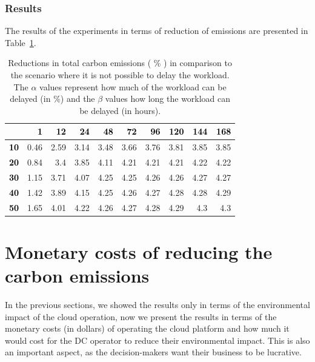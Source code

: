 \subsubsection{Results}

The results of the experiments in terms of reduction of  emissions are presented in Table~\ref{tab:flex_scheduling}.


\begin{table}[h]
\caption{Reductions in total carbon emissions ( \% ) in comparison to the scenario where it is not possible to delay the workload. The $\alpha$ values represent how much of the workload can be delayed (in \%) and the $\beta$ values how long the workload can be delayed (in hours). }\centering
\label{tab:flex_scheduling}
\begin{tabular}{|l|r|r|r|r|r|r|r|r|r|}
\hline
\backslashbox{$\alpha$}{$\beta$} &   \textcolor{black}{\textbf{ 1}} &  \textcolor{black}{\textbf{ 12 }} &  \textcolor{black}{\textbf{ 24 }} &  \textcolor{black}{\textbf{ 48 }}  &   \textcolor{black}{\textbf{ 72 }} &   \textcolor{black}{\textbf{ 96 }} &   \textcolor{black}{\textbf{ 120  }} &   \textcolor{black}{\textbf{ 144 }} &   \textcolor{black}{\textbf{ 168 }} \\ 
     \hline
 \textcolor{black}{ \textbf{10}}   &  0.46 &  2.59 &  3.14 &  3.48 &  3.66 &  3.76 &  3.81 &  3.85 &  3.85 \\ 
\hline
 \textcolor{black}{ \textbf{20}}   &  0.84 &  3.4 &  3.85 &  4.11 &  4.21 &  4.21 &  4.21 &  4.22 &  4.22 \\ 
\hline
 \textcolor{black}{ \textbf{30}}   &  1.15 &  3.71 &  4.07 &  4.25 &  4.25 &  4.26 &  4.26 &  4.27 &  4.27 \\ 
\hline
 \textcolor{black}{ \textbf{40}}   &  1.42 &  3.89 &  4.15 &  4.25 &  4.26 &  4.27 &  4.28 &  4.28 &  4.29 \\ 
\hline
 \textcolor{black}{ \textbf{50}}   &  1.65 &  4.01 &  4.22 &  4.26 &  4.27 &  4.28 &  4.29 &  4.3 &  4.3 \\ 
\hline
\end{tabular}
\end{table}


\section{Monetary costs of reducing the carbon emissions}
\label{sec:costs}

In the previous sections, we showed the results only in terms of the environmental impact of the cloud operation, now we present the results in terms of the monetary costs (in dollars) of operating the cloud platform and how much it would cost for the DC operator to reduce their environmental impact. This is also an important aspect, as the decision-makers want their business to be lucrative.

